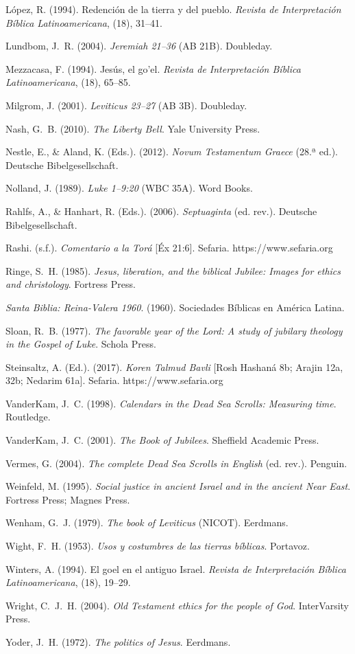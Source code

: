 \documentclass[11pt,letterpaper]{article}
\newcommand{\refapa}[1]{\par{\RaggedRight\hangindent=1.27cm\hangafter=1\noindent #1\par}\vspace{4pt}}
\begin{document}
\refapa{López, R. (1994). Redención de la tierra y del pueblo. \emph{Revista de Interpretación Bíblica Latinoamericana}, (18), 31--41.}
\refapa{Lundbom, J.~R. (2004). \emph{Jeremiah 21--36} (AB 21B). Doubleday.}
\refapa{Mezzacasa, F. (1994). Jesús, el go'el. \emph{Revista de Interpretación Bíblica Latinoamericana}, (18), 65--85.}
\refapa{Milgrom, J. (2001). \emph{Leviticus 23--27} (AB 3B). Doubleday.}
\refapa{Nash, G.~B. (2010). \emph{The Liberty Bell}. Yale University Press.}
\refapa{Nestle, E., \& Aland, K. (Eds.). (2012). \emph{Novum Testamentum Graece} (28.ª ed.). Deutsche Bibelgesellschaft.}
\refapa{Nolland, J. (1989). \emph{Luke 1--9:20} (WBC 35A). Word Books.}
\refapa{Rahlfs, A., \& Hanhart, R. (Eds.). (2006). \emph{Septuaginta} (ed. rev.). Deutsche Bibelgesellschaft.}
\refapa{Rashi. (s.f.). \emph{Comentario a la Torá} [Éx 21:6]. Sefaria. https://www.sefaria.org}
\refapa{Ringe, S.~H. (1985). \emph{Jesus, liberation, and the biblical Jubilee: Images for ethics and christology}. Fortress Press.}
\refapa{\emph{Santa Biblia: Reina-Valera 1960}. (1960). Sociedades Bíblicas en América Latina.}
\refapa{Sloan, R.~B. (1977). \emph{The favorable year of the Lord: A study of jubilary theology in the Gospel of Luke}. Schola Press.}
\refapa{Steinsaltz, A. (Ed.). (2017). \emph{Koren Talmud Bavli} [Rosh Hashaná 8b; Arajin 12a, 32b; Nedarim 61a]. Sefaria. https://www.sefaria.org}
\refapa{VanderKam, J.~C. (1998). \emph{Calendars in the Dead Sea Scrolls: Measuring time}. Routledge.}
\refapa{VanderKam, J.~C. (2001). \emph{The Book of Jubilees}. Sheffield Academic Press.}
\refapa{Vermes, G. (2004). \emph{The complete Dead Sea Scrolls in English} (ed. rev.). Penguin.}
\refapa{Weinfeld, M. (1995). \emph{Social justice in ancient Israel and in the ancient Near East}. Fortress Press; Magnes Press.}
\refapa{Wenham, G.~J. (1979). \emph{The book of Leviticus} (NICOT). Eerdmans.}
\refapa{Wight, F.~H. (1953). \emph{Usos y costumbres de las tierras bíblicas}. Portavoz.}
\refapa{Winters, A. (1994). El goel en el antiguo Israel. \emph{Revista de Interpretación Bíblica Latinoamericana}, (18), 19--29.}
\refapa{Wright, C.~J.~H. (2004). \emph{Old Testament ethics for the people of God}. InterVarsity Press.}
\refapa{Yoder, J.~H. (1972). \emph{The politics of Jesus}. Eerdmans.}
\end{document}
